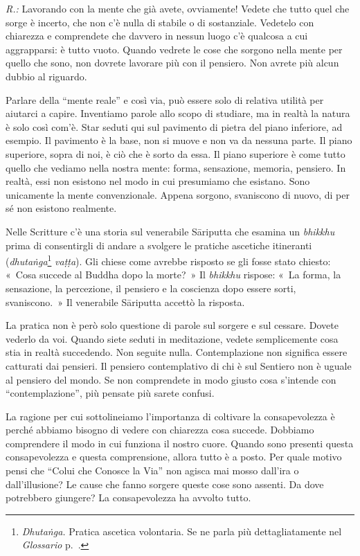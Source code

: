 \emph{R.:} Lavorando con la mente che già avete, ovviamente! Vedete che tutto
quel che sorge è incerto, che non c'è nulla di stabile o di sostanziale.
Vedetelo con chiarezza e comprendete che davvero in nessun luogo c'è
qualcosa a cui aggrapparsi: è tutto vuoto. Quando vedrete le cose che
sorgono nella mente per quello che sono, non dovrete lavorare più con il
pensiero. Non avrete più alcun dubbio al riguardo.

Parlare della ``mente reale'' e così via, può essere solo di relativa
utilità per aiutarci a capire. Inventiamo parole allo scopo di studiare,
ma in realtà la natura è solo così com'è. Star seduti qui sul pavimento
di pietra del piano inferiore, ad esempio. Il pavimento è la base, non
si muove e non va da nessuna parte. Il piano superiore, sopra di noi, è
ciò che è sorto da essa. Il piano superiore è come tutto quello che
vediamo nella nostra mente: forma, sensazione, memoria, pensiero. In
realtà, essi non esistono nel modo in cui presumiamo che esistano. Sono
unicamente la mente convenzionale. Appena sorgono, svaniscono di nuovo,
di per sé non esistono realmente.

Nelle Scritture c'è una storia sul venerabile Sāriputta che esamina un
\emph{bhikkhu} prima di
consentirgli di andare a svolgere le pratiche ascetiche itineranti
(\emph{dhutaṅga}\footnote{\emph{Dhutaṅga.} Pratica ascetica volontaria.
  Se ne parla più dettagliatamente nel
  \emph{Glossario} p.~\pageref{glossary-dhutanga}.} \emph{vaṭṭa}). Gli chiese come avrebbe risposto se
gli fosse stato chiesto: «~Cosa succede al Buddha dopo la morte?~» Il
\emph{bhikkhu} rispose: «~La forma, la sensazione, la percezione, il
pensiero e la coscienza dopo essere sorti, svaniscono.~» Il venerabile
Sāriputta accettò la risposta.

La pratica non è però solo questione di parole sul sorgere e sul
cessare. Dovete vederlo da voi. Quando siete seduti in meditazione,
vedete semplicemente cosa stia in realtà succedendo. Non seguite nulla.
Contemplazione non significa essere catturati dai pensieri. Il pensiero
contemplativo di chi è sul Sentiero non è uguale al pensiero del mondo.
Se non comprendete in modo giusto cosa s'intende con ``contemplazione'',
più pensate più sarete confusi.

La ragione per cui sottolineiamo l'importanza di coltivare la
consapevolezza è perché abbiamo bisogno di vedere con chiarezza cosa
succede. Dobbiamo comprendere il modo in cui funziona il nostro cuore.
Quando sono presenti questa consapevolezza e questa comprensione, allora
tutto è a posto. Per quale motivo pensi che ``Colui che Conosce la Via''
non agisca mai mosso dall'ira o dall'illusione? Le cause che fanno
sorgere queste cose sono assenti. Da dove potrebbero giungere? La
consapevolezza ha avvolto tutto.

